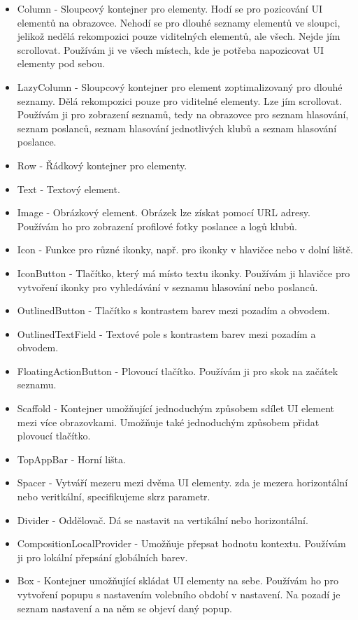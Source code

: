 \begin{itemize}
	\item Column - Sloupcový kontejner pro elementy. Hodí se pro pozicování UI elementů na obrazovce. Nehodí se pro dlouhé seznamy elementů ve sloupci, jelikož nedělá rekompozici pouze viditelných elementů, ale všech. Nejde jím scrollovat. Používám ji ve všech místech, kde je potřeba napozicovat UI elementy pod sebou.
	\item LazyColumn - Sloupcový kontejner pro element zoptimalizovaný pro dlouhé seznamy. Dělá rekompozici pouze pro viditelné elementy. Lze jím scrollovat. Používám ji pro zobrazení seznamů, tedy na obrazovce pro seznam hlasování, seznam poslanců, seznam hlasování jednotlivých klubů a seznam hlasování poslance.
	\item Row - Řádkový kontejner pro elementy.
	\item Text - Textový element.
	\item Image - Obrázkový element. Obrázek lze získat pomocí URL adresy. Používám ho pro zobrazení profilové fotky poslance a logů klubů.
	\item Icon - Funkce pro různé ikonky, např. pro ikonky v hlavičce nebo v dolní liště.
	\item IconButton - Tlačítko, který má místo textu ikonky. Používám ji hlavičce pro vytvoření ikonky pro vyhledávání v seznamu hlasování nebo poslanců.
	\item OutlinedButton - Tlačítko s kontrastem barev mezi pozadím a obvodem.
	\item OutlinedTextField - Textové pole s kontrastem barev mezi pozadím a obvodem.
	\item FloatingActionButton - Plovoucí tlačítko. Používám ji pro skok na začátek seznamu.
	\item Scaffold - Kontejner umožňující jednoduchým způsobem sdílet UI element mezi více obrazovkami. Umožňuje také jednoduchým způsobem přidat plovoucí tlačítko.
	\item TopAppBar - Horní lišta.
	\item Spacer - Vytváří mezeru mezi dvěma UI elementy. zda je mezera horizontální nebo veritkální, specifikujeme skrz parametr.
	\item Divider - Oddělovač. Dá se nastavit na vertikální nebo horizontální.
	\item CompositionLocalProvider - Umožňuje přepsat hodnotu kontextu. Používám ji pro lokální přepsání globálních barev.
	\item Box - Kontejner umožňující skládat UI elementy na sebe. Používám ho pro vytvoření popupu s nastavením volebního období v nastavení. Na pozadí je seznam nastavení a na něm se objeví daný popup.

\end{itemize}
